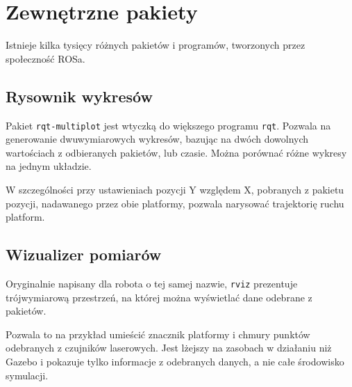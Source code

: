 \section{Zewnętrzne pakiety}
	Istnieje kilka tysięcy różnych pakietów i programów, tworzonych przez społeczność ROSa.
	
	\subsection{Rysownik wykresów}
		Pakiet \texttt{rqt-multiplot} jest wtyczką do większego programu \texttt{rqt}.
		Pozwala na generowanie dwuwymiarowych wykresów, bazując na dwóch dowolnych wartościach z odbieranych pakietów, lub czasie.
		Można porównać różne wykresy na jednym układzie.
		
		W szczególności przy ustawieniach pozycji Y względem X, pobranych z pakietu pozycji, nadawanego przez obie platformy, pozwala narysować trajektorię ruchu platform.
	\subsection{Wizualizer pomiarów}
		Oryginalnie napisany dla robota o tej samej nazwie, \texttt{rviz} prezentuje trójwymiarową przestrzeń, na której można wyświetlać 
		dane odebrane z pakietów.
		
		Pozwala to na przykład umieścić znacznik platformy i chmury punktów odebranych z czujników laserowych.
		Jest lżejszy na zasobach w działaniu niż Gazebo i pokazuje tylko informacje z odebranych danych, a nie całe środowisko symulacji.
		
		
	
	
	
	
	

